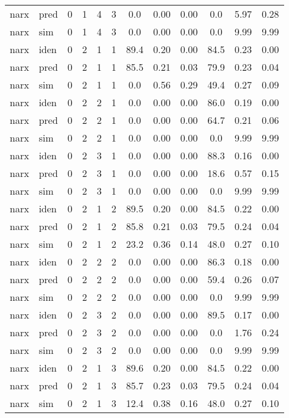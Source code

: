 \begin{center}
\begin{longtable}{ll|cccc|ccc|ccc}
narx & pred & 0 & 1 & 4 & 3 & 0.0 & 0.00 & 0.00 & 0.0 & 5.97 & 0.28 \\ 
narx & sim & 0 & 1 & 4 & 3 & 0.0 & 0.00 & 0.00 & 0.0 & 9.99 & 9.99 \\ 
 \hline 
narx & iden & 0 & 2 & 1 & 1 & 89.4 & 0.20 & 0.00 & 84.5 & 0.23 & 0.00 \\ 
narx & pred & 0 & 2 & 1 & 1 & 85.5 & 0.21 & 0.03 & 79.9 & 0.23 & 0.04 \\ 
narx & sim & 0 & 2 & 1 & 1 & 0.0 & 0.56 & 0.29 & 49.4 & 0.27 & 0.09 \\ 
 \hline 
narx & iden & 0 & 2 & 2 & 1 & 0.0 & 0.00 & 0.00 & 86.0 & 0.19 & 0.00 \\ 
narx & pred & 0 & 2 & 2 & 1 & 0.0 & 0.00 & 0.00 & 64.7 & 0.21 & 0.06 \\ 
narx & sim & 0 & 2 & 2 & 1 & 0.0 & 0.00 & 0.00 & 0.0 & 9.99 & 9.99 \\ 
 \hline 
narx & iden & 0 & 2 & 3 & 1 & 0.0 & 0.00 & 0.00 & 88.3 & 0.16 & 0.00 \\ 
narx & pred & 0 & 2 & 3 & 1 & 0.0 & 0.00 & 0.00 & 18.6 & 0.57 & 0.15 \\ 
narx & sim & 0 & 2 & 3 & 1 & 0.0 & 0.00 & 0.00 & 0.0 & 9.99 & 9.99 \\ 
 \hline 
narx & iden & 0 & 2 & 1 & 2 & 89.5 & 0.20 & 0.00 & 84.5 & 0.22 & 0.00 \\ 
narx & pred & 0 & 2 & 1 & 2 & 85.8 & 0.21 & 0.03 & 79.5 & 0.24 & 0.04 \\ 
narx & sim & 0 & 2 & 1 & 2 & 23.2 & 0.36 & 0.14 & 48.0 & 0.27 & 0.10 \\ 
 \hline 
narx & iden & 0 & 2 & 2 & 2 & 0.0 & 0.00 & 0.00 & 86.3 & 0.18 & 0.00 \\ 
narx & pred & 0 & 2 & 2 & 2 & 0.0 & 0.00 & 0.00 & 59.4 & 0.26 & 0.07 \\ 
narx & sim & 0 & 2 & 2 & 2 & 0.0 & 0.00 & 0.00 & 0.0 & 9.99 & 9.99 \\ 
 \hline 
narx & iden & 0 & 2 & 3 & 2 & 0.0 & 0.00 & 0.00 & 89.5 & 0.17 & 0.00 \\ 
narx & pred & 0 & 2 & 3 & 2 & 0.0 & 0.00 & 0.00 & 0.0 & 1.76 & 0.24 \\ 
narx & sim & 0 & 2 & 3 & 2 & 0.0 & 0.00 & 0.00 & 0.0 & 9.99 & 9.99 \\ 
 \hline 
narx & iden & 0 & 2 & 1 & 3 & 89.6 & 0.20 & 0.00 & 84.5 & 0.22 & 0.00 \\ 
narx & pred & 0 & 2 & 1 & 3 & 85.7 & 0.23 & 0.03 & 79.5 & 0.24 & 0.04 \\ 
narx & sim & 0 & 2 & 1 & 3 & 12.4 & 0.38 & 0.16 & 48.0 & 0.27 & 0.10 \\ 

\end{longtable}
\end{center}
